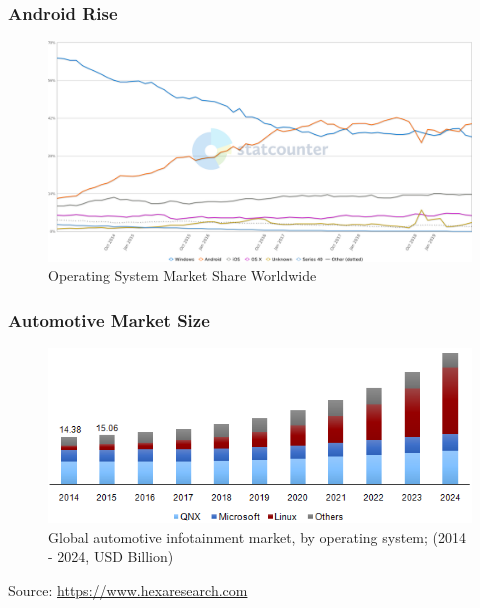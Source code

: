 \documentclass[aspectratio=169]{beamer}
\begin{document}
\begin{frame}
  \frametitle{Android Rise}
  \vspace*{-2mm} %
    \begin{figure}
      \centering
      \includegraphics[scale=0.35]{images/os-stat.png}
      \vspace*{-2mm} %
      \caption{Operating System Market Share Worldwide}
    \end{figure}
  \vspace*{-12mm} %
\end{frame}

\begin{frame}
  \frametitle{Automotive Market Size}
    \begin{figure}
      \centering
      \includegraphics[scale=0.6]{images/automotive-market.png}
      \caption{Global automotive infotainment market, by operating system;
               \newline (2014 - 2024, USD Billion)}
    \end{figure}
    Source: \href{https://www.hexaresearch.com}{https://www.hexaresearch.com}
\end{frame}
\end{document}
